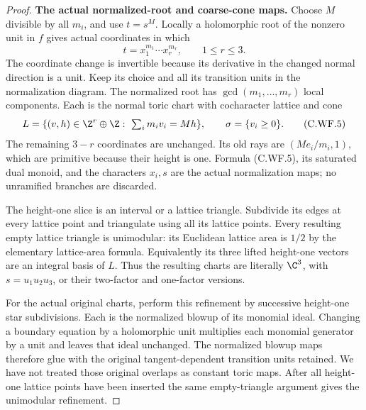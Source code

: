 \begin{proof}
\par\medskip\noindent\textbf{The actual normalized-root and coarse-cone maps.}
Choose \(M\) divisible by all \(m_i\), and use \(t=s^M\).
Locally a holomorphic root of the nonzero unit in \(f\) gives
actual coordinates in which
\[
 t=x_1^{m_1}\cdots x_r^{m_r},\qquad 1\le r\le3.
\tag{C.WF.4}
\]
The coordinate change is invertible because its derivative in
the changed normal direction is a unit.  Keep its choice and
all its transition units in the normalization diagram.
The normalized root has \(\gcd(m_1,\ldots,m_r)\) local components.
Each is the normal toric chart with cocharacter lattice and cone
\[
 L=\{(v,h)\in\Z^r\oplus\Z:\ \textstyle\sum_i m_iv_i=Mh\},
 \qquad \sigma=\{v_i\ge0\}.
\tag{C.WF.5}
\]
The remaining \(3-r\) coordinates are unchanged.  Its old rays
are \((M e_i/m_i,1)\), which are primitive because their height
is one.  Formula (C.WF.5), its saturated dual monoid, and the
characters \(x_i,s\) are the actual normalization maps; no
unramified branches are discarded.

The height-one slice is an interval or a lattice triangle.
Subdivide its edges at every lattice point and triangulate
using all its lattice points.  Every resulting empty lattice
triangle is unimodular: its Euclidean lattice area is \(1/2\)
by the elementary lattice-area formula.  Equivalently its
three lifted height-one vectors are an integral basis of \(L\).
Thus the resulting charts are literally
\(\C^3\), with \(s=u_1u_2u_3\), or their two-factor and
one-factor versions.

For the actual original charts, perform this refinement by
successive height-one star subdivisions.  Each is the normalized
blowup of its monomial ideal.  Changing a boundary equation by a
holomorphic unit multiplies each monomial generator by a unit
and leaves that ideal unchanged.  The normalized blowup maps
therefore glue with the original tangent-dependent transition
units retained.  We have not treated those original overlaps
as constant toric maps.  After all height-one lattice points
have been inserted the same empty-triangle argument gives the
unimodular refinement.


\end{proof}
